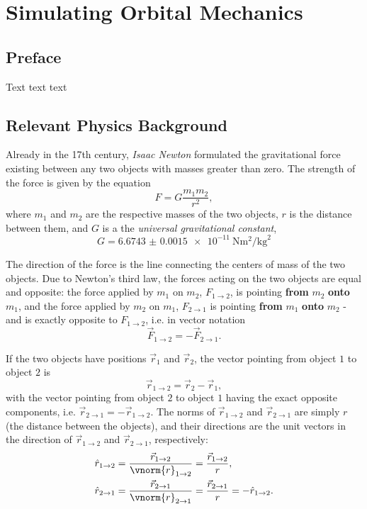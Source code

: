 \chapter{Simulating Orbital Mechanics}
\section{Preface}
Text text text

\section{Relevant Physics Background}
Already in the 17th century, \textit{Isaac Newton} formulated the gravitational force existing between any two objects with masses greater than zero. The strength of the force is given by the equation
\begin{equation}
    F = G\frac{m_{1}m_{2}}{r^{2}},
    \label{eq:force_gravity}
\end{equation}
where $m_{1}$ and $m_{2}$ are the respective masses of the two objects, $r$ is the distance between them, and $G$ is a the \textit{universal gravitational constant},
\begin{equation}
    G = \SI{6.6743(15)e-11}{\newton\metre\squared\per\kg\squared}
    \label{eq:universal_gravity_constant}
\end{equation}

The direction of the force is the line connecting the centers of mass of the two objects. Due to Newton's third law, the forces acting on the two objects are equal and opposite: the force applied by $m_{1}$ on $m_{2}$, $F_{1\to2}$, is pointing \textbf{from} $m_{2}$ \textbf{onto} $m_{1}$, and the force applied by $m_{2}$ on $m_{1}$, $F_{2\to1}$ is pointing \textbf{from} $m_{1}$ \textbf{onto} $m_{2}$ - and is exactly opposite to $F_{1\to2}$, i.e. in vector notation
\begin{equation}
    \vec{F}_{1\to2} = -\vec{F}_{2\to1}.
    \label{eq:gravity_force_vector_directions}
\end{equation}

If the two objects have positions $\vec{r}_{1}$ and $\vec{r}_{2}$, the vector pointing from object $1$ to object $2$ is
\begin{equation}
  \vec{r}_{1\to2} = \vec{r}_{2} - \vec{r}_{1},
  \label{eq:position_vector}
\end{equation}
with the vector pointing from object $2$ to object $1$ having the exact opposite components, i.e. $\vec{r}_{2\to1}=-\vec{r}_{1\to2}$. The norms of $\vec{r}_{1\to2}$ and $\vec{r}_{2\to1}$ are simply $r$ (the distance between the objects), and their directions are the unit vectors in the direction of $\vec{r}_{1\to2}$ and $\vec{r}_{2\to1}$, respectively:
\begin{align}
  \hat{r}_{1\to2} &= \frac{\vec{r}_{1\to2}}{\vnorm{r}_{1\to2}} = \frac{\vec{r}_{1\to2}}{r}\nonumber,\\
  \hat{r}_{2\to1} &= \frac{\vec{r}_{2\to1}}{\vnorm{r}_{2\to1}} = \frac{\vec{r}_{2\to1}}{r} = -\hat{r}_{1\to2}.
  \label{eq:normed_position_vector}
\end{align}

